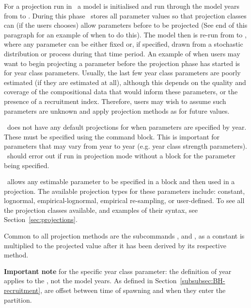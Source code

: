 For a projection run in \CNAME\, a model is initialised and run through the model years from  to . During this phase \CNAME\ stores all parameter values so that projection classes can (if the users chooses) allow parameters before  to be projected (See end of this paragraph for an example of when to do this). The model then is re-run from  to , where any parameter can be either fixed or, if specified, drawn from a stochastic distribution or process during that time period. An example of when users may want to begin projecting a parameter before the projection phase has started is for year class parameters. Usually, the last few year class parameters are poorly estimated (if they are estimated at all), although this depends on the quality and coverage of the compositional data that would inform these parameters, or the presence of a recruitment index. Therefore, users may wish to assume such parameters are unknown and apply projection methods as for future values.

\CNAME\ does not have any default projections for when parameters are specified by year. These must be specified using the  command block. This is important for parameters that may vary from year to year (e.g. year class strength parameters). \CNAME\ should error out if run in projection mode without a  block for the  parameter being specified.

\CNAME\ allows any estimable parameter to be specified in a  block and then used in a projection. The available projection types for these parameters include: constant, lognormal, empirical-lognormal, empirical re-sampling, or user-defined. To see all the projection classes available, and examples of their syntax, see Section~\ref{sec:projections}.

Common to all projection methods are the subcommands ,  and , as a constant is multiplied to the projected value after it has been derived by its respective method.

\textbf{Important note} for the specific year class parameter: the definition of year applies to the , not the model years. As defined in Section~\ref{subsubsec:BH-recruitment},  are offset between time of spawning and when they enter the partition. 

